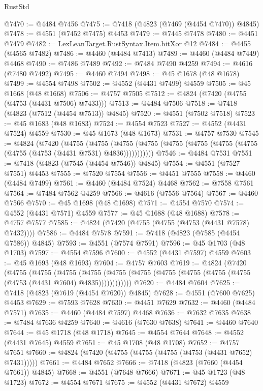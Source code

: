 \begin{lexlean}{RustStd}
\begin{coremodule}
@7470 := @4484 @7456
@7475 := @7418 (@4823 (@7469 (@4454 @7470)) @4845)
@7478 := @4551 (@7452 @7475) @4453
@7479 := @7445 @7478
@7480 := @4451 @7479
@7482 := LexLeanTarget.RustSyntax.Item.bitXor @12
@7484 := @4455 (@4565 @7482)
@7486 := @4460 (@4484 @7413)
@7489 := @4460 (@4484 @7449) @4468
@7490 := @7486 @7489
@7492 := @7484 @7490 @4259
@7494 := @4616 (@7480 @7492)
@7495 := @4460 @7494
@7498 := @45 @1678 (@48 @1678)
@7499 := @4554 @7498
@7502 := @4552 (@4431 @7499) @4559
@7505 := @45 @1668 (@48 @1668)
@7506 := @4757 @7505
@7512 := @4824 (@7420 (@4755 (@4753 (@4431 @7506) @7433)))
@7513 := @4484 @7506
@7518 := @7418 (@4823 (@7512 (@4454 @7513)) @4845)
@7520 := @4551 (@7502 @7518)
@7523 := @45 @1683 (@48 @1683)
@7524 := @4554 @7523
@7527 := @4552 (@4431 @7524) @4559
@7530 := @45 @1673 (@48 @1673)
@7531 := @4757 @7530
@7545 := @4824
    (@7420
      (@4755
        (@4755
          (@4755 (@4755 (@4755 (@4755 (@4755 (@4755 (@4755 (@4753 (@4431 @7531) @4836)))))))))))
@7546 := @4484 @7531
@7551 := @7418 (@4823 (@7545 (@4454 @7546)) @4845)
@7554 := @4551 (@7527 @7551) @4453
@7555 := @7520 @7554
@7556 := @4451 @7555
@7558 := @4460 (@4484 @7499)
@7561 := @4460 (@4484 @7524) @4468
@7562 := @7558 @7561
@7564 := @7484 @7562 @4259
@7566 := @4616 (@7556 @7564)
@7567 := @4460 @7566
@7570 := @45 @1698 (@48 @1698)
@7571 := @4554 @7570
@7574 := @4552 (@4431 @7571) @4559
@7577 := @45 @1688 (@48 @1688)
@7578 := @4757 @7577
@7585 := @4824 (@7420 (@4755 (@4755 (@4753 (@4431 @7578) @7432))))
@7586 := @4484 @7578
@7591 := @7418 (@4823 (@7585 (@4454 @7586)) @4845)
@7593 := @4551 (@7574 @7591)
@7596 := @45 @1703 (@48 @1703)
@7597 := @4554 @7596
@7600 := @4552 (@4431 @7597) @4559
@7603 := @45 @1693 (@48 @1693)
@7604 := @4757 @7603
@7619 := @4824
    (@7420
      (@4755
        (@4755
          (@4755
            (@4755 (@4755 (@4755 (@4755 (@4755 (@4755 (@4755 (@4753 (@4431 @7604) @4835))))))))))))
@7620 := @4484 @7604
@7625 := @7418 (@4823 (@7619 (@4454 @7620)) @4845)
@7628 := @4551 (@7600 @7625) @4453
@7629 := @7593 @7628
@7630 := @4451 @7629
@7632 := @4460 (@4484 @7571)
@7635 := @4460 (@4484 @7597) @4468
@7636 := @7632 @7635
@7638 := @7484 @7636 @4259
@7640 := @4616 (@7630 @7638)
@7641 := @4460 @7640
@7644 := @45 @1718 (@48 @1718)
@7645 := @4554 @7644
@7648 := @4552 (@4431 @7645) @4559
@7651 := @45 @1708 (@48 @1708)
@7652 := @4757 @7651
@7660 := @4824 (@7420 (@4755 (@4755 (@4755 (@4753 (@4431 @7652) @7431)))))
@7661 := @4484 @7652
@7666 := @7418 (@4823 (@7660 (@4454 @7661)) @4845)
@7668 := @4551 (@7648 @7666)
@7671 := @45 @1723 (@48 @1723)
@7672 := @4554 @7671
@7675 := @4552 (@4431 @7672) @4559

\end{coremodule}
\end{lexlean}
